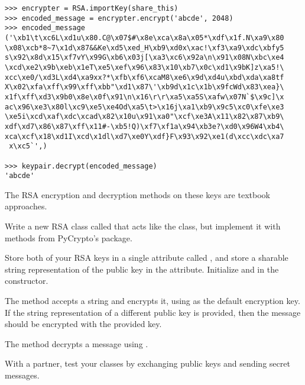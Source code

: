 \begin{lstlisting}
>>> encrypter = RSA.importKey(share_this)
>>> encoded_message = encrypter.encrypt('abcde', 2048)
>>> encoded_message
('\xb1\t\xc6L\xd1u\x80.C@\x07$#\x8e\xca\x8a\x05*\xdf\x1f.N\xa9\x80
\x08\xcb*8~7\x1d\x87&&Ke\xd5\xed_H\xb9\xd0x\xac!\xf3\xa9\xdc\xbfy5
s\x92\x8d\x15\xf7vY\x99G\xb6\x03j[\xa3\xc6\x92a\n\x91\x08N\xbc\xe4
\xcd\xe2\x9b\xeb\x1eT\xe5\xef\x96\x83\x10\xb7\x0c\xd1\x9bK]z\xa5!\
xcc\xe0/\xd3L\xd4\xa9xx?*\xfb\xf6\xcaM8\xe6\x9d\xd4u\xbd\xda\xa8tf
X\x02\xfa\xff\x99\xff\xbb"\xd1\x87\'\xb9d\x1c\x1b\x9fcWd\x83\xea}\
x1f\xff\xd3\x9b0\x8e\x0f\x91\n\x16\r\r\xa5\xa5S\xafw\x07N`$\x9c]\x
ac\x96\xe3\x80l\xc9\xe5\xe4Od\xa5\t>\x16j\xa1\xb9\x9c5\xc0\xfe\xe3
\xe5i\xcd\xaf\xdc\xcad\x82\x10u\x91\xa0"\xcf\xe3A\x11\x82\x87\xb9\
xdf\xd7\x86\x87\xff\x11#-\xb5!Q)\xf7\xf1a\x94\xb3e?\xd0\x96W4\xb4\
xca\xcf\x18\xd1I\xcd\x1dl\xd7\xe0Y\xdf}F\x93\x92\xe1(d\xcc\xdc\xa7
 x\xc5`',)

>>> keypair.decrypt(encoded_message)
'abcde'
\end{lstlisting}

The RSA encryption and decryption methods on these keys are textbook approaches.

\begin{comment}
However, to increase security, we will want to pad the messages so every message encrypted with a particular key will become exactly as large (in bits) as the key itself.
A commonly used padding algorithm is implemented in PyCrypto in the \li{Crypto.Cipher.PKCS1_OAEP} module.
\begin{lstlisting}
>>> from Crypto.Cipher import PKCS1_OAEP as oaep

# generate a new key from the original RSA key.
# This key can encrypt and decrypt
>>> paddedkey = oaep.new(keypair)
>>> encrypted = paddedkey.encrypt('hello world')
>>> paddedkey.decrypt(encrypted)
'hello world'
\end{lstlisting}
\end{comment}

\begin{problem}
Write a new RSA class called  that acts like the  class, but implement it with methods from PyCrypto's  package.

Store both of your RSA keys in a single attribute called , and store a sharable string representation of the public key in the  attribute.
Initialize  and  in the constructor.

The  method accepts a string and encrypts it, using  as the default encryption key.
If the string representation of a different public key is provided, then the message should be encrypted with the provided key.

The  method decrypts a message using .

With a partner, test your classes by exchanging public keys and sending secret messages.
\end{problem}

